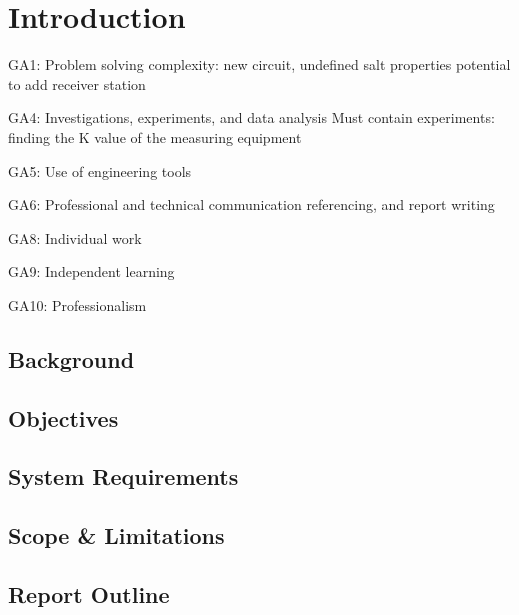 \chapter{Introduction} \label{ch:introduction}

GA1: Problem solving
complexity: new circuit, undefined salt properties
potential to add receiver station

GA4: Investigations, experiments, and data analysis
Must contain experiments: finding the K value of the measuring equipment

GA5: Use of engineering tools

GA6: Professional and technical communication
referencing, and report writing

GA8: Individual work

GA9: Independent learning

GA10: Professionalism



\section{Background}
\lipsum[1]

\section{Objectives}
\lipsum[1]

\section{System Requirements}
\lipsum[1]

\section{Scope \& Limitations}
\lipsum[1]

\section{Report Outline}
\lipsum[1]